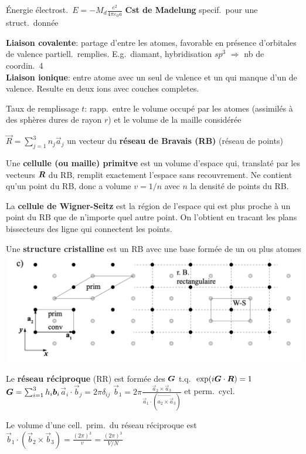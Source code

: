 \begin{squishlist}
    \item Énergie électrost.\ $E = - M_d \frac{e^2}{4\pi \varepsilon_0 a}$ \textbf{Cst de Madelung} specif.\ pour une struct.\ donnée
    \item \textbf{Liaison covalente}: partage d'\elec entre les atomes, favorable en présence d'orbitales de valence partiell.\ remplies. E.g.\ diamant, hybridisation $sp^3$ $\Rightarrow$ nb de coordin.\ 4 \\
    \textbf{Liaison ionique}: entre atome avec un seul \elec de valence et un qui manque d'un \elec de valence. Resulte en deux ions avec couches completes.
    \item Taux de remplissage $t$: rapp.\ entre le volume occupé par les atomes (assimilés à des sphères dures de rayon $r$) et le volume de la maille considérée
\end{squishlist}
\begin{squishlist}
    \item $\vec{R} = \sum_{j=1}^{3} n_j \vec{a}_j$ un vecteur du \textbf{réseau de Bravais (RB)} (réseau de points)
    \item Une \textbf{cellulle (ou maille) primitve} est un volume d'espace qui, translaté par les vecteurs $\bm{R}$ du RB, remplit exactement l'espace sans recouvrement. Ne contient qu'un point du RB, donc a volume $v = 1/n$ avec $n$ la densité de points du RB.
    \item La \textbf{cellule de Wigner-Seitz} est la région de l'espace qui est plus proche à un point du RB que de n'importe quel autre point. On l'obtient en tracant les plans bissecteurs des ligne qui connectent les points.
    \item Une \textbf{structure cristalline} est un RB avec une base formée de un ou plus atomes
        \includegraphics[width=0.6\columnwidth]{figures/structure-exemple.png}
    \item Le \textbf{réseau réciproque} (RR) est formée des $\bm{G}$ t.q.\ $\exp(i \bm{G} \cdot \bm{R}) = 1$ \\
    $\bm{G} = \sum_{i=1}^{3}h_i \bm{b}_i $\squishsep $\vec{a}_i \cdot \vec{b}_j = 2 \pi \delta_{ij}$ \squishsep $\vec{b}_1 = 2 \pi \frac{\vec{a}_2 \times \vec{a}_3}{\vec{a}_1 \cdot (\vec{a_2 \times \vec{a}_3})}$ et perm.\ cycl.\ 
    \item Le volume d'une cell.\ prim.\ du réseau réciproque est $\vec{b}_1 \cdot (\vec{b}_2 \times \vec{b}_3) = \frac{(2\pi)^3}{v} = \frac{(2\pi)^3}{V/N}$
\end{squishlist}    


